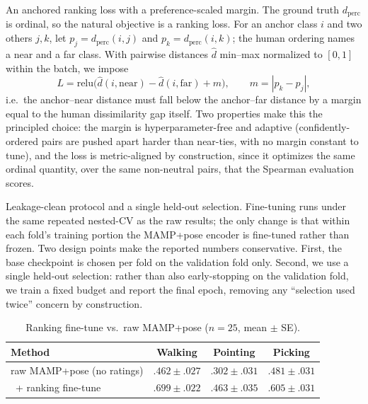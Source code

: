 \documentclass[letterpaper]{article} %
\begin{document}
{An anchored ranking loss with a preference-scaled margin.} The ground truth
$d_{\text{perc}}$ is {ordinal}, so the natural objective is a {ranking} loss. For an
anchor class $i$ and two others $j,k$, let $p_j = d_{\text{perc}}(i,j)$ and $p_k =
d_{\text{perc}}(i,k)$; the human ordering names a {near} and a {far} class. With pairwise
distances $\hat d$ min--max normalized to $[0,1]$ within the batch, we impose
\[
    L = \mathrm{relu}\big(\hat d(i,\text{near}) - \hat d(i,\text{far}) + m\big),
    \qquad m = |p_k - p_j|,
\]
i.e.\ the anchor--near distance must fall below the anchor--far distance by a margin equal to the
{human dissimilarity gap} itself. Two properties make this the principled choice: the
margin is {hyperparameter-free and adaptive} (confidently-ordered pairs are pushed apart
harder than near-ties, with no margin constant to tune), and the loss is {metric-aligned by
construction}, since it optimizes the same ordinal quantity, over the same non-neutral pairs, that the
Spearman evaluation scores.

{Leakage-clean protocol and a single held-out selection.} Fine-tuning runs under the same
repeated nested-CV as the raw results; the only change is that within each fold's training portion
the MAMP+pose encoder is fine-tuned rather than frozen. Two design points make the reported numbers
conservative. First, the base checkpoint is chosen {per fold on the validation fold only}.
Second, we use a {single} held-out selection: rather than also early-stopping on the
validation fold, we train a {fixed budget and report the final epoch}, removing any
``selection used twice'' concern by construction.

\begin{table}[h]
\centering
\caption{Ranking fine-tune vs.\ raw MAMP+pose ($n=25$, mean $\pm$ SE).}
\setlength{\tabcolsep}{1pt}
\small
\begin{tabular}{lccc}
\toprule
Method & Walking & Pointing & Picking \\
\midrule
raw MAMP+pose (no ratings) & $.462{\scriptstyle\pm}.027$ & $.302{\scriptstyle\pm}.031$ & $.481{\scriptstyle\pm}.031$ \\
{\ + ranking fine-tune} & $\mathbf{.699{\scriptstyle\pm}.022}$ & $\mathbf{.463{\scriptstyle\pm}.035}$ & $\mathbf{.605{\scriptstyle\pm}.031}$ \\
\bottomrule
\end{tabular}
\end{table}
\end{document}
